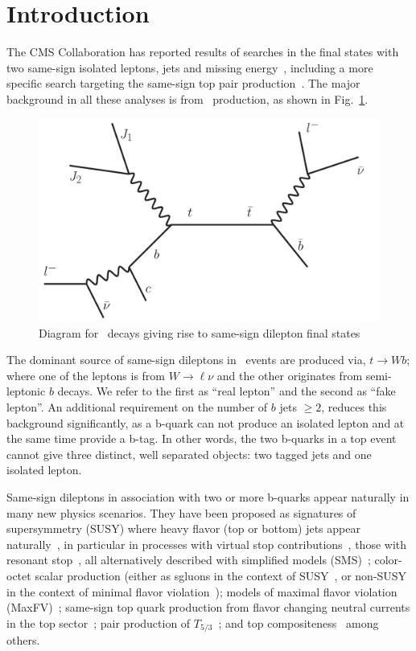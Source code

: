 \section{Introduction}
\label{sec:intro}
The CMS Collaboration has reported results of searches in the final states with two same-sign isolated leptons,
jets and missing energy~\cite{sspaper2010,ssnote2011,sspaper2011},
including a more specific search targeting the same-sign top pair production~\cite{sstop}.
The major background in all these analyses is from \ttbar\ production, as shown in Fig.~\ref{fig:ttbar}.

\begin{figure}[htb]
\begin{center}
\includegraphics[width=0.6\linewidth, height=0.35\linewidth]{figs/ttbar.pdf}
\caption{ Diagram for \ttbar\ decays giving rise to same-sign dilepton final states \label{fig:ttbar}}
\end{center}
\end{figure}

The dominant source of same-sign dileptons in \ttbar\ events are produced via, $t \rightarrow W b$; where 
one of the leptons is from $W \rightarrow \ell \nu $ and the other originates from semi-leptonic $b$ decays. 
We refer to the first as ``real lepton'' and the second as ``fake lepton''.
An additional requirement on the number of $b$ jets $\geq 2$, 
reduces this background significantly,
as a b-quark can not produce an isolated lepton and at the same time 
provide a b-tag.  In other words, the two b-quarks in a top event
cannot give three distinct, well separated objects: two tagged jets
and one isolated lepton.

Same-sign dileptons in association with two or more b-quarks appear naturally in many new physics scenarios.
They have been proposed as signatures of supersymmetry 
(SUSY) where heavy flavor (top or bottom) jets appear naturally~\cite{naturalness1,naturalness2,naturalness3,naturalness4},
in particular in processes with virtual stop contributions~\cite{stopVirtual,stopVirtualPRD},
those with resonant stop~\cite{stopReal},
all alternatively described with simplified models (SMS)~\cite{wacker}; 
color-octet scalar production (either as sgluons in the context of SUSY~\cite{sgluons},
or non-SUSY in the context of minimal flavor violation~\cite{colorOctetScalars}); 
models of maximal flavor violation (MaxFV)~\cite{mxflv1,mxflv2,mxflv3}; 
same-sign top quark production from flavor changing neutral currents in the top sector~\cite{fcnczprime};
pair production of $T_{5/3}$~\cite{t53};
and top compositeness~\cite{topcomp1,topcomp2,topcomp3}
among others.

